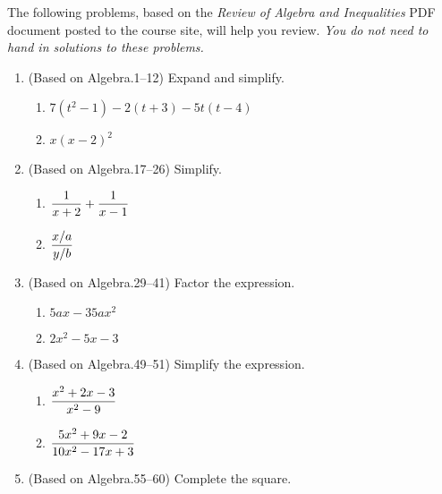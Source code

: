 \documentclass[11pt]{article}
\title{\commonPSTitleZeroZeroOne}
\author{\commonAuthor}
\date{\commonDateZeroZeroOne}
\newcommand{\ds}{\displaystyle}
\begin{document}
\maketitle
\thispagestyle{empty}

\noindent
The following problems, based on the \emph{Review of Algebra and
  Inequalities} PDF document posted to the course site, will help you
review.  \emph{You do not need to hand in solutions to these
  problems.}
\begin{enumerate}
\item (Based on Algebra.1--12) Expand and simplify. %
  \begin{multicols}{2}
  \begin{enumerate}
  \item $\ds 7(t^2-1)-2(t+3)-5t(t-4)$
  \item $\ds x(x-2)^2$
  \end{enumerate}
  \end{multicols}
\item (Based on Algebra.17--26) Simplify. %
  \begin{multicols}{2}
  \begin{enumerate}
  \item $\ds\vphantom{\frac{1}{x}} \frac{1}{x+2} + \frac{1}{x-1}$
  \item $\ds\vphantom{\frac{1}{x}} \frac{x/a}{y/b}$
  \end{enumerate}
  \end{multicols}
\item (Based on Algebra.29--41) Factor the expression. %
  \begin{multicols}{2}
  \begin{enumerate}
  \item $\ds 5ax - 35ax^2$
  \item $\ds 2x^2-5x-3$
  \end{enumerate}
  \end{multicols}
\item (Based on Algebra.49--51) Simplify the expression. %
  \begin{multicols}{2}
  \begin{enumerate}
  \item $\ds\vphantom{\frac{x^2}{x^2}} \frac{x^2+2x-3}{x^2-9}$
  \item $\ds\vphantom{\frac{x^2}{x^2}} \frac{5x^2+9x-2}{10x^2-17x+3}$
  \end{enumerate}
  \end{multicols}
\item (Based on Algebra.55--60) Complete the square. %

\end{enumerate}
\end{document}
